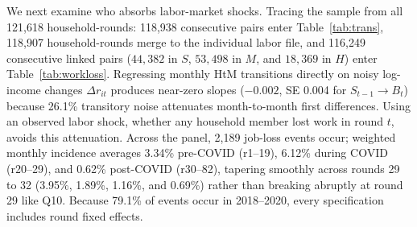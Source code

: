 \documentclass[11pt]{article}
\begin{document}
We next examine who absorbs labor-market shocks. Tracing the sample from all 121,618 household-rounds: 118,938 consecutive pairs enter Table~\ref{tab:trans}, 118,907 household-rounds merge to the individual labor file, and 116,249 consecutive linked pairs ($44{,}382$ in $S$, $53{,}498$ in $M$, and $18{,}369$ in $H$) enter Table~\ref{tab:workloss}. Regressing monthly HtM transitions directly on noisy log-income changes $\Delta r_{it}$ produces near-zero slopes ($-0.002$, SE 0.004 for $S_{t-1} \to B_t$) because 26.1\% transitory noise attenuates month-to-month first differences. Using an observed labor shock, whether any household member lost work in round $t$, avoids this attenuation. Across the panel, 2,189 job-loss events occur; weighted monthly incidence averages 3.34\% pre-COVID (r1--19), 6.12\% during COVID (r20--29), and 0.62\% post-COVID (r30--82), tapering smoothly across rounds 29 to 32 (3.95\%, 1.89\%, 1.16\%, and 0.69\%) rather than breaking abruptly at round 29 like Q10. Because 79.1\% of events occur in 2018--2020, every specification includes round fixed effects.
\end{document}
